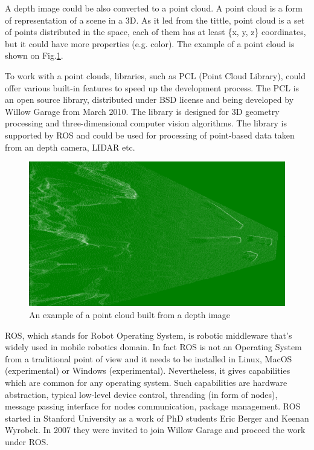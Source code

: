 \documentclass{ctuthesis}
\begin{document}
A depth image could be also converted to a point cloud. A point cloud is a form of representation of a scene in a 3D. As it led from the tittle, point cloud is a set of points distributed in the space, each of them has at least \{x, y, z\} coordinates, but it could have more properties (e.g. color). The example of a point cloud is shown on Fig.\ref{fig:1-4}.

To work with a point clouds, libraries, such as PCL (Point Cloud Library), could offer various built-in features to speed up the development process. The PCL is an open source library, distributed under BSD license and being developed by Willow Garage from March 2010. The library is designed for 3D geometry processing and three-dimensional computer vision algorithms. The library is supported by ROS and could be used for processing of point-based data taken from an depth camera, LIDAR etc.

\begin{figure}[htpb]
    \centering
    \includegraphics[width=\textwidth]{point_cloud_2.png}
    \caption{An example of a point cloud built from a depth image}
    \label{fig:1-4}
\end{figure}

ROS, which stands for Robot Operating System, is robotic middleware that's widely used in mobile robotics domain. In fact ROS is not an Operating System from a traditional point of view and it needs to be installed in Linux, MacOS (experimental) or Windows (experimental). Nevertheless, it gives capabilities which are common for any operating system. Such capabilities are hardware abstraction, typical low-level device control, threading (in form of nodes), message passing interface for nodes communication, package management. ROS started in Stanford University as a work of PhD students Eric Berger and Keenan Wyrobek. In 2007 they were invited to join Willow Garage and proceed the work under ROS.
\end{document}

